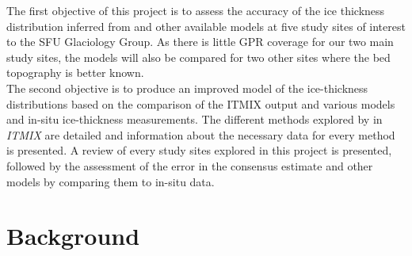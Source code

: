 \documentclass[a4, 12pt]{article}
\newcommand{\citeg}[1]{\citep[e.g.][]{#1}}
\begin{document}
The first objective of this project is to assess the accuracy of the ice thickness distribution inferred from \citet{farinotti2019consensus} and other available  models at five study sites of interest to the SFU Glaciology Group. As there is little GPR coverage for our two main study sites, the models will also be compared for two other sites where the bed topography is better known.\\
The second objective is to produce an improved model of the ice-thickness distributions based on the comparison of the ITMIX output and various models and in-situ ice-thickness measurements. The different methods explored by \citeauthor{farinotti2019consensus} in \textit{ITMIX} are detailed and information about the necessary data for every method is presented. A review of every study sites explored in this project is presented, followed by the assessment of the error in the consensus estimate\citeg{farinotti2019consensus} and other models by comparing them to in-situ data.

\section{Background}
\end{document}

